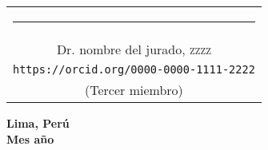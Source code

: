 \vspace*{1.0cm}

\begin{center}
  \begin{tabular}{c}
    {\footnotesize \rule{7cm}{0.0009cm}} \\
    {\footnotesize Dr. nombre del jurado, \textsc{zzzz}} \\
    {\footnotesize \texttt{https://orcid.org/0000-0000-1111-2222}} \\
    {\footnotesize (Tercer miembro)}
  \end{tabular}
\end{center}

\vspace*{1.0cm}

\begin{center}
  {
    \baselineskip=10pt
    \textbf{Lima, Per\'u} \\
    \textbf{Mes a\~no}
  }
\end{center}
